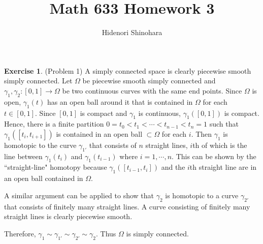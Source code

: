 \documentclass[12pt, psamsfonts]{amsart}
\theoremstyle{definition}
\newtheorem*{exer}{Exercise}
\theoremstyle{remark}
\numberwithin{equation}{section}
\begin{document}
\title{Math 633 Homework 3}
\author{Hidenori Shinohara}
\maketitle

\begin{exer}{(Problem 1)}
  A simply connected space is clearly piecewise smooth simply connected.
  Let $\Omega$ be piecewise smooth simply connected and $\gamma_1, \gamma_2: [0, 1] \rightarrow \Omega$ be two continuous curves with the same end points.
  Since $\Omega$ is open, $\gamma_1(t)$ has an open ball around it that is contained in $\Omega$ for each $t \in [0, 1]$.
  Since $[0, 1]$ is compact and $\gamma_1$ is continuous, $\gamma_1([0, 1])$ is compact.
  Hence, there is a finite partition $0 = t_0 < t_1 < \cdots < t_{n - 1} < t_n = 1$ such that $\gamma_1([t_i, t_{i + 1}])$ is contained in an open ball $\subset \Omega$ for each $i$.
  Then $\gamma_1$ is homotopic to the curve $\gamma_{1'}$ that consists of $n$ straight lines, $i$th of which is the line between $\gamma_1(t_i)$ and $\gamma_1(t_{i - 1})$ where $i = 1, \cdots, n$.
  This can be shown by the ``straight-line" homotopy because $\gamma_1([t_{i - 1}, t_{i}])$ and the $i$th straight line are in an open ball contained in $\Omega$.

  A similar argument can be applied to show that $\gamma_2$ is homotopic to a curve $\gamma_{2'}$ that consists of finitely many straight lines.
  A curve consisting of finitely many straight lines is clearly piecewise smooth.

  Therefore, $\gamma_1 \sim \gamma_{1'} \sim \gamma_{2'} \sim \gamma_2$.
  Thus $\Omega$ is simply connected.
\end{exer}
\end{document}
